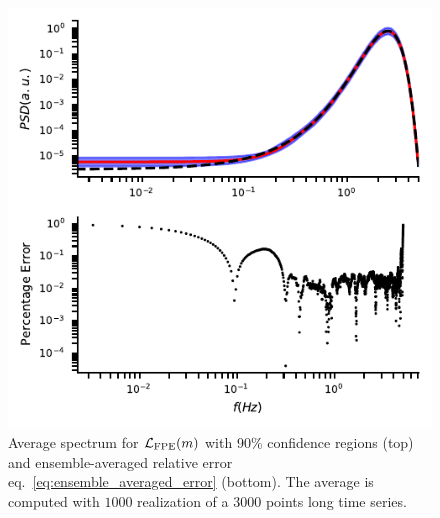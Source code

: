 \documentclass[twocolumn,showpacs,preprintnumbers,nofootinbib,prd,
superscriptaddress,10pt]{revtex4-1}
\begin{document}
\begin{figure}[t]
	\centering
	\includegraphics[width = \linewidth]{Images/optimisers_comparison/normal/FPE_spectrum_estim.pdf}
	\caption{Average spectrum for $\mathcal{L}_{\rm FPE}(m)$ with 90\% confidence regions (top) and ensemble-averaged relative error eq.~\eqref{eq:ensemble_averaged_error} (bottom). The average is computed with $1000$ realization of a $3000$ points long time series.}
	\label{fig:FPEmean}
\end{figure}
\end{document}
